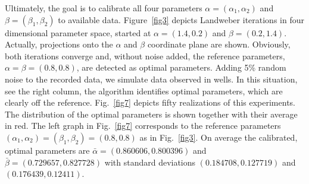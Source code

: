Ultimately, the goal is to calibrate all four parameters $\alpha =
(\alpha_1, \alpha_2)$ and $\beta = (\beta_1, \beta_2)$ to available
data.  Figure~\ref{fig3} depicts Landweber iterations in four
dimensional parameter space, started at $\alpha=(1.4, 0.2)$ and
$\beta=(0.2, 1.4)$.  Actually, projections onto the $\alpha$ and
$\beta$ coordinate plane are shown.  Obviously, both iterations
converge and, without noise added, the reference parameters, $\alpha
= \beta = (0.8, 0.8)$, are detected as optimal parameters.  Adding 5\%
random noise to the recorded data, we simulate data observed in wells.
In this situation, see the right column, the algorithm identifies
optimal parameters, which are clearly off the reference.
Fig.~\ref{fig7} depicts fifty realizations of this experiments.  The
distribution of the optimal parameters is shown together with their
average in red.  The left graph in Fig.~\ref{fig7} corresponds to the
reference parameters
$(\alpha_1, \alpha_2)=(\beta_1, \beta_2)=(0.8,0.8)$ as in
Fig.~\ref{fig3}.  On average the calibrated, optimal parameters are
$\bar\alpha=(0.860606, 0.800396)$ and $\bar\beta=(0.729657, 0.827728)$
with standard deviations $(0.184708, 0.127719)$ and $(0.176439,
0.12411)$.


